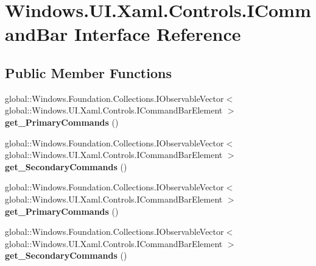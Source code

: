 \hypertarget{interface_windows_1_1_u_i_1_1_xaml_1_1_controls_1_1_i_command_bar}{}\section{Windows.\+U\+I.\+Xaml.\+Controls.\+I\+Command\+Bar Interface Reference}
\label{interface_windows_1_1_u_i_1_1_xaml_1_1_controls_1_1_i_command_bar}
\subsection*{Public Member Functions}
\begin{DoxyCompactItemize}
\item 
\mbox{\label{interface_windows_1_1_u_i_1_1_xaml_1_1_controls_1_1_i_command_bar_a9d860b1fd007c4d2148fdc0cfca3c153}} 
global\+::\+Windows.\+Foundation.\+Collections.\+I\+Observable\+Vector$<$ global\+::\+Windows.\+U\+I.\+Xaml.\+Controls.\+I\+Command\+Bar\+Element $>$ {\bfseries get\+\_\+\+Primary\+Commands} ()
\item 
\mbox{\label{interface_windows_1_1_u_i_1_1_xaml_1_1_controls_1_1_i_command_bar_add39f6054832fd504bf4758935e12b34}} 
global\+::\+Windows.\+Foundation.\+Collections.\+I\+Observable\+Vector$<$ global\+::\+Windows.\+U\+I.\+Xaml.\+Controls.\+I\+Command\+Bar\+Element $>$ {\bfseries get\+\_\+\+Secondary\+Commands} ()
\item 
\mbox{\label{interface_windows_1_1_u_i_1_1_xaml_1_1_controls_1_1_i_command_bar_a9d860b1fd007c4d2148fdc0cfca3c153}} 
global\+::\+Windows.\+Foundation.\+Collections.\+I\+Observable\+Vector$<$ global\+::\+Windows.\+U\+I.\+Xaml.\+Controls.\+I\+Command\+Bar\+Element $>$ {\bfseries get\+\_\+\+Primary\+Commands} ()
\item 
\mbox{\label{interface_windows_1_1_u_i_1_1_xaml_1_1_controls_1_1_i_command_bar_add39f6054832fd504bf4758935e12b34}} 
global\+::\+Windows.\+Foundation.\+Collections.\+I\+Observable\+Vector$<$ global\+::\+Windows.\+U\+I.\+Xaml.\+Controls.\+I\+Command\+Bar\+Element $>$ {\bfseries get\+\_\+\+Secondary\+Commands} ()

\end{DoxyCompactItemize}
